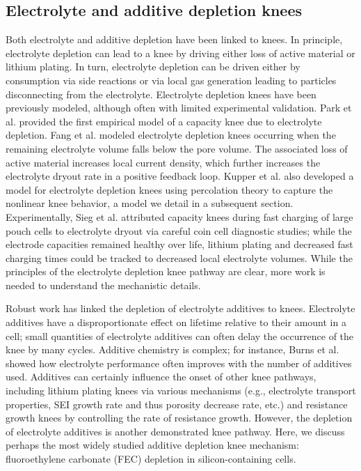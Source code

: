 \documentclass[journal=jpclcd,manuscript=article]{achemso}
\begin{document}
\subsection{Electrolyte and additive depletion knees}

Both electrolyte and additive depletion have been linked to knees.
In principle, electrolyte depletion can lead to a knee by driving either loss of active material\cite{mao_calendar_2017, kupper_end--life_2018, fang_capacity_2021} or lithium plating\cite{sieg_fast-charging_2022}.
In turn, electrolyte depletion can be driven either by consumption via side reactions\cite{park_semi-empirical_2017,sieg_fast-charging_2022} or via local gas generation leading to particles disconnecting from the electrolyte.\cite{mao_calendar_2017, kupper_end--life_2018}
Electrolyte depletion knees have been previously modeled, although often with limited experimental validation.
Park et al.\cite{park_semi-empirical_2017} provided the first empirical model of a capacity knee due to electrolyte depletion.
Fang et al.\cite{fang_capacity_2021} modeled electrolyte depletion knees occurring when the remaining electrolyte volume falls below the pore volume. The associated loss of active material increases local current density, which further increases the electrolyte dryout rate in a positive feedback loop.
Kupper et al.\cite{kupper_end--life_2018} also developed a model for electrolyte depletion knees using percolation theory to capture the nonlinear knee behavior, a model we detail in a subsequent section. 
Experimentally, Sieg et al.\cite{sieg_fast-charging_2022} attributed capacity knees during fast charging of large pouch cells to electrolyte dryout via careful coin cell diagnostic studies; while the electrode capacities remained healthy over life, lithium plating and decreased fast charging times could be tracked to decreased local electrolyte volumes.
While the principles of the electrolyte depletion knee pathway are clear, more work is needed to understand the mechanistic details. 

Robust work has linked the depletion of electrolyte additives to knees. Electrolyte additives have a disproportionate effect on lifetime relative to their amount in a cell; small quantities of electrolyte additives can often delay the occurrence of the knee by many cycles.\cite{ma_editors_2019, li_comparison_2017} Additive chemistry is complex; for instance, Burns et al.\cite{burns_predicting_2013} showed how electrolyte performance often improves with the number of additives used. Additives can certainly influence the onset of other knee pathways, including lithium plating knees via various mechanisms (e.g., electrolyte transport properties, SEI growth rate and thus porosity decrease rate, etc.) and resistance growth knees by controlling the rate of resistance growth\cite{ma_editors_2019}. However, the depletion of electrolyte additives is another demonstrated knee pathway. Here, we discuss perhaps the most widely studied additive depletion knee mechanism: fluoroethylene carbonate (FEC) depletion in silicon-containing cells.
\end{document}
